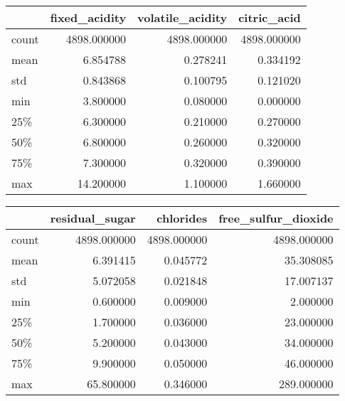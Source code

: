 \documentclass[]{IEEEtran}
\begin{document}
\begin{table}[!h]
\begin{tabular}{lrrr}
\toprule
{} &  fixed\_acidity &  volatile\_acidity &  citric\_acid \\
\midrule
count &    4898.000000 &       4898.000000 &  4898.000000 \\
mean  &       6.854788 &          0.278241 &     0.334192 \\
std   &       0.843868 &          0.100795 &     0.121020 \\
min   &       3.800000 &          0.080000 &     0.000000 \\
25\%   &       6.300000 &          0.210000 &     0.270000 \\
50\%   &       6.800000 &          0.260000 &     0.320000 \\
75\%   &       7.300000 &          0.320000 &     0.390000 \\
max   &      14.200000 &          1.100000 &     1.660000 \\
\bottomrule
\end{tabular}
\end{table}
\begin{table}[!h]
\begin{tabular}{lrrr}
\toprule
{} &  residual\_sugar &    chlorides &  free\_sulfur\_dioxide \\
\midrule
count &     4898.000000 &  4898.000000 &          4898.000000 \\
mean  &        6.391415 &     0.045772 &            35.308085 \\
std   &        5.072058 &     0.021848 &            17.007137 \\
min   &        0.600000 &     0.009000 &             2.000000 \\
25\%   &        1.700000 &     0.036000 &            23.000000 \\
50\%   &        5.200000 &     0.043000 &            34.000000 \\
75\%   &        9.900000 &     0.050000 &            46.000000 \\
max   &       65.800000 &     0.346000 &           289.000000 \\
\bottomrule
\end{tabular}
\end{table}
\end{document}
